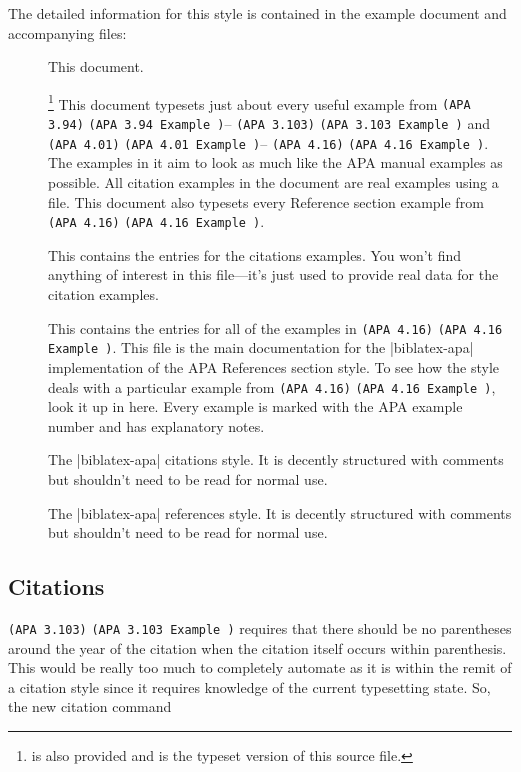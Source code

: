 \documentclass{ltxdockit}
\newcommand\apa[2][]{\ifthenelse{\equal{#1}{}}%
                       {\texttt{(APA #2)}}%
                       {\texttt{(APA #2 Example #1)}}}
\begin{document}
The detailed information for this style is contained in the example document and
accompanying  files:
\begin{description}
\item[] This document.
\item[]\footnote{
    is also provided and is the typeset version of this \latex source
    file.} This document typesets just about every useful example from
  \apa{3.94}--\apa{3.103} and \apa{4.01}--\apa{4.16}. The examples in it
  aim to look as much like the APA manual examples as possible. All
  citation examples in the document are real examples using a 
  file. This document also typesets every Reference section example from
  \apa{4.16}.
\item[] This contains the 
  entries for the citations examples. You won't find anything of interest
  in this file---it's just used to provide real data for the citation
  examples.
\item[] This contains the
   entries for all of the examples in \apa{4.16}. This file is
  the main documentation for the |biblatex-apa| implementation of the APA
  References section style. To see how the style deals with a particular
  example from \apa{4.16}, look it up in here. Every example is marked with
  the APA example number and has explanatory notes.
\item[] The |biblatex-apa| citations style. It is
  decently structured with comments but shouldn't need to be read for
  normal use.
\item[] The |biblatex-apa| references style. It is
  decently structured with comments but shouldn't need to be read for
  normal use.
\end{description}

\subsection{Citations}

\apa{3.103} requires that there should be no parentheses around the year of
the citation when the citation itself occurs within parenthesis. This would
be really too much to completely automate as it is within the remit of a
citation style since it requires knowledge of the current typesetting
state. So, the new citation command
\end{document}
